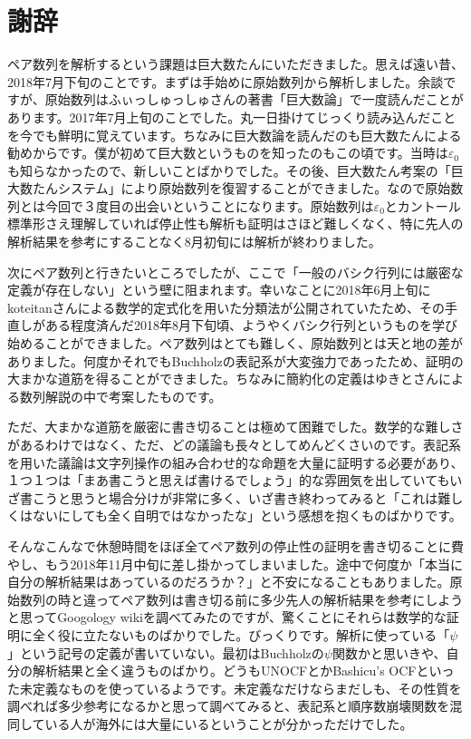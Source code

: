\documentclass[dvipdfmx,uplatex]{jsarticle}
\newif\iffull
\theoremstyle{customnonumberbreakfortheorem}
\theoremstyle{customnonumberbreakforproof}
\begin{document}
\iffull

\section{謝辞}

ペア数列を解析するという課題は巨大数たんにいただきました。思えば遠い昔、2018年7月下旬のことです。まずは手始めに原始数列から解析しました。余談ですが、原始数列はふぃっしゅっしゅさんの著書「巨大数論」で一度読んだことがあります。2017年7月上旬のことでした。丸一日掛けてじっくり読み込んだことを今でも鮮明に覚えています。ちなみに巨大数論を読んだのも巨大数たんによる勧めからです。僕が初めて巨大数というものを知ったのもこの頃です。当時は\(\varepsilon_0\)も知らなかったので、新しいことばかりでした。その後、巨大数たん考案の「巨大数たんシステム」により原始数列を復習することができました。なので原始数列とは今回で３度目の出会いということになります。原始数列は\(\varepsilon_0\)とカントール標準形さえ理解していれば停止性も解析も証明はさほど難しくなく、特に先人の解析結果を参考にすることなく8月初旬には解析が終わりました。

次にペア数列と行きたいところでしたが、ここで「一般のバシク行列には厳密な定義が存在しない」という壁に阻まれます。幸いなことに2018年6月上旬にkoteitanさんによる数学的定式化を用いた分類法が公開されていたため、その手直しがある程度済んだ2018年8月下旬頃、ようやくバシク行列というものを学び始めることができました。ペア数列はとても難しく、原始数列とは天と地の差がありました。何度かそれでもBuchholzの表記系が大変強力であったため、証明の大まかな道筋を得ることができました。ちなみに簡約化の定義はゆきとさんによる数列解説の中で考案したものです。

ただ、大まかな道筋を厳密に書き切ることは極めて困難でした。数学的な難しさがあるわけではなく、ただ、どの議論も長々としてめんどくさいのです。表記系を用いた議論は文字列操作の組み合わせ的な命題を大量に証明する必要があり、１つ１つは「まあ書こうと思えば書けるでしょう」的な雰囲気を出していてもいざ書こうと思うと場合分けが非常に多く、いざ書き終わってみると「これは難しくはないにしても全く自明ではなかったな」という感想を抱くものばかりです。

そんなこんなで休憩時間をほぼ全てペア数列の停止性の証明を書き切ることに費やし、もう2018年11月中旬に差し掛かってしまいました。途中で何度か「本当に自分の解析結果はあっているのだろうか？」と不安になることもありました。原始数列の時と違ってペア数列は書き切る前に多少先人の解析結果を参考にしようと思ってGoogology wikiを調べてみたのですが、驚くことにそれらは数学的な証明に全く役に立たないものばかりでした。びっくりです。解析に使っている「\(\psi\)」という記号の定義が書いていない。最初はBuchholzの\(\psi\)関数かと思いきや、自分の解析結果と全く違うものばかり。どうもUNOCFとかBashicu's OCFといった未定義なものを使っているようです。未定義なだけならまだしも、その性質を調べれば多少参考になるかと思って調べてみると、表記系と順序数崩壊関数を混同している人が海外には大量にいるということが分かっただけでした。
\end{document}

